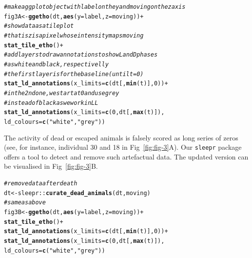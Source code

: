 \documentclass[10pt,letterpaper]{article}\usepackage[]{graphicx}\usepackage[]{color}
\makeatletter
\newcommand{\hlnum}[1]{\textcolor[rgb]{0.686,0.059,0.569}{#1}}%
\newcommand{\hlstr}[1]{\textcolor[rgb]{0.192,0.494,0.8}{#1}}%
\newcommand{\hlcom}[1]{\textcolor[rgb]{0.678,0.584,0.686}{\textit{#1}}}%
\newcommand{\hlopt}[1]{\textcolor[rgb]{0,0,0}{#1}}%
\newcommand{\hlstd}[1]{\textcolor[rgb]{0.345,0.345,0.345}{#1}}%
\newcommand{\hlkwb}[1]{\textcolor[rgb]{0.69,0.353,0.396}{#1}}%
\newcommand{\hlkwc}[1]{\textcolor[rgb]{0.333,0.667,0.333}{#1}}%
\newcommand{\hlkwd}[1]{\textcolor[rgb]{0.737,0.353,0.396}{\textbf{#1}}}%
\newenvironment{kframe}{%
 \def\at@end@of@kframe{}%
 \ifinner\ifhmode%
  \def\at@end@of@kframe{\end{minipage}}%
  \begin{minipage}{\columnwidth}%
 \fi\fi%
 \def\FrameCommand##1{\hskip\@totalleftmargin \hskip-\fboxsep
 \colorbox{shadecolor}{##1}\hskip-\fboxsep
     \hskip-\linewidth \hskip-\@totalleftmargin \hskip\columnwidth}%
 \MakeFramed {\advance\hsize-\width
   \@totalleftmargin\z@ \linewidth\hsize
   \@setminipage}}%
 {\par\unskip\endMakeFramed%
 \at@end@of@kframe}
\newenvironment{knitrout}{}{} %
\makeatother
\begin{document}
\begin{knitrout}
\color{fgcolor}\begin{kframe}
\begin{alltt}
\hlcom{# make a ggplot object with label on the y and moving on the z axis}
\hlstd{fig3A} \hlkwb{<-} \hlkwd{ggetho}\hlstd{(dt,} \hlkwd{aes}\hlstd{(}\hlkwc{y} \hlstd{= label,} \hlkwc{z} \hlstd{= moving))} \hlopt{+}
  \hlcom{# show data as a tile plot}
  \hlcom{# that is z is a pixel whose intensity maps moving}
  \hlkwd{stat_tile_etho}\hlstd{()} \hlopt{+}
  \hlcom{# add layers to draw annotations to show L and D phases}
  \hlcom{# as white and black, respectivelly}
  \hlcom{# the first layer is for the baseline (until t = 0)}
  \hlkwd{stat_ld_annotations}\hlstd{(}\hlkwc{x_limits} \hlstd{=} \hlkwd{c}\hlstd{(dt[,}\hlkwd{min}\hlstd{(t)],} \hlnum{0}\hlstd{))} \hlopt{+}
  \hlcom{# in the 2nd one, we start at 0 and use grey }
  \hlcom{# instead of black as we work in LL}
  \hlkwd{stat_ld_annotations}\hlstd{(}\hlkwc{x_limits} \hlstd{=} \hlkwd{c}\hlstd{(}\hlnum{0}\hlstd{, dt[,} \hlkwd{max}\hlstd{(t)]),}
                      \hlkwc{ld_colours} \hlstd{=} \hlkwd{c}\hlstd{(}\hlstr{"white"}\hlstd{,} \hlstr{"grey"}\hlstd{))}
\end{alltt}
\end{kframe}
\end{knitrout}

The activity of dead or escaped animals is falsely scored as long series of zeros (see, for instance, individual 30 and 18 in Fig~\ref{fig:fig-3}A).
Our \texttt{sleepr} package offers a tool to detect and remove such artefactual data.
The updated version can be visualised in Fig~\ref{fig:fig-3}B.

\begin{knitrout}
\color{fgcolor}\begin{kframe}
\begin{alltt}
\hlcom{# remove data after death}
\hlstd{dt} \hlkwb{<-} \hlstd{sleepr}\hlopt{::}\hlkwd{curate_dead_animals}\hlstd{(dt, moving)}
\hlcom{# same as above}
\hlstd{fig3B} \hlkwb{<-} \hlkwd{ggetho}\hlstd{(dt,} \hlkwd{aes}\hlstd{(}\hlkwc{y} \hlstd{= label,} \hlkwc{z} \hlstd{= moving))} \hlopt{+}
    \hlkwd{stat_tile_etho}\hlstd{()} \hlopt{+}
    \hlkwd{stat_ld_annotations}\hlstd{(}\hlkwc{x_limits} \hlstd{=} \hlkwd{c}\hlstd{(dt[,} \hlkwd{min}\hlstd{(t)],} \hlnum{0}\hlstd{))} \hlopt{+}
    \hlkwd{stat_ld_annotations}\hlstd{(}\hlkwc{x_limits} \hlstd{=} \hlkwd{c}\hlstd{(}\hlnum{0}\hlstd{, dt[,} \hlkwd{max}\hlstd{(t)]),}
                        \hlkwc{ld_colours} \hlstd{=} \hlkwd{c}\hlstd{(}\hlstr{"white"}\hlstd{,} \hlstr{"grey"}\hlstd{))}
\end{alltt}
\end{kframe}
\end{knitrout}
\end{document}
